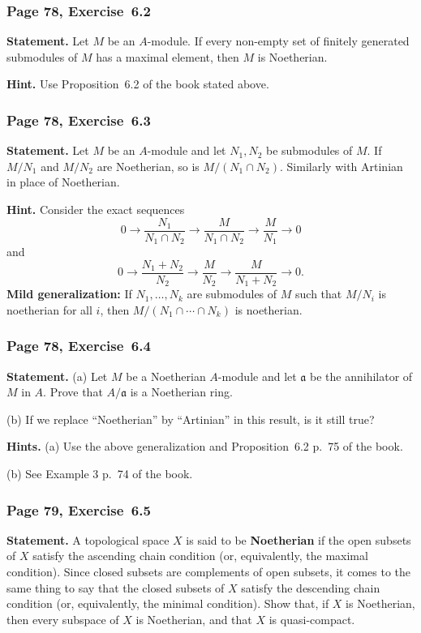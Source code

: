 \documentclass[12pt,letterpaper]{article}%
\newcommand{\mf}{\mathfrak}
\newcommand{\aaa}{\mf a}
\newcommand{\nn}{\noindent}
\begin{document}
\subsubsection{Page 78, Exercise~6.2}%

\textbf{Statement.} Let $M$ be an $A$-module. If every non-empty set of finitely generated submodules of $M$ has a maximal element, then $M$ is Noetherian.

\nn\textbf{Hint.} Use Proposition~6.2 of the book stated above.

\subsubsection{Page 78, Exercise~6.3}%

\textbf{Statement.} Let $M$ be an $A$-module and let $N_1,N_2$ be submodules of $M$. If $M/N_1$ and $M/N_2$ are Noetherian, so is $M/(N_1\cap N_2)$. Similarly with Artinian in place of Noetherian.

\nn\textbf{Hint.} Consider the exact sequences 
$$
0\to\frac{N_1}{N_1\cap N_2}\to\frac M{N_1\cap N_2}\to\frac M{N_1}\to0
$$ 
and 
$$
0\to\frac{N_1+N_2}{N_2}\to\frac M{N_2}\to\frac M{N_1+N_2}\to0.
$$ 
\nn\textbf{Mild generalization:} If $N_1,\dots,N_k$ are submodules of $M$ such that $M/N_i$ is noetherian for all $i$, then $M/(N_1\cap\cdots\cap N_k)$ is noetherian. 

\subsubsection{Page 78, Exercise~6.4}\label{64}%

\textbf{Statement.} (a) Let $M$ be a Noetherian $A$-module and let $\aaa$ be the annihilator of $M$ in $A$. Prove that $A/\aaa$ is a Noetherian ring.

\nn(b) If we replace ``Noetherian'' by ``Artinian'' in this result, is it still true?

\nn\textbf{Hints.} (a) Use the above generalization and Proposition~6.2 p.~75 of the book.

\nn(b) See Example 3 p.~74 of the book.

\subsubsection{Page 79, Exercise~6.5}\label{ex6.5}%

\textbf{Statement.} A topological space $X$ is said to be \textbf{Noetherian} if the open subsets of $X$ satisfy the ascending chain condition (or, equivalently, the maximal condition). Since closed subsets are complements of open subsets, it comes to the same thing to say that the closed subsets of $X$ satisfy the descending chain condition (or, equivalently, the minimal condition). Show that, if $X$ is Noetherian, then every subspace of $X$ is Noetherian, and that $X$ is quasi-compact.
\end{document}
